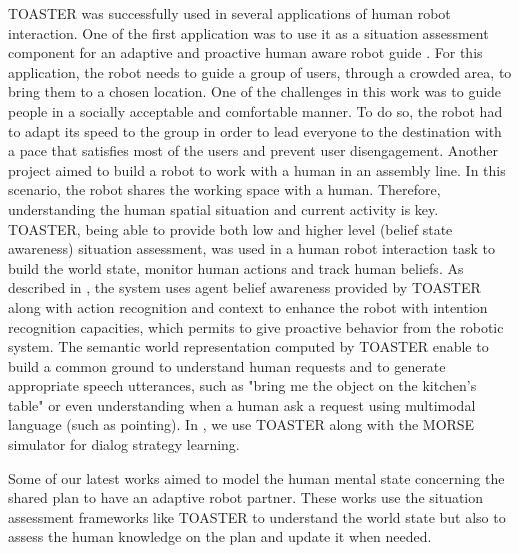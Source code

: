 \documentclass[a4paper]{article}
\begin{document}
TOASTER was successfully used in several applications of human robot interaction. One of the first application was to use it as a situation assessment component for an adaptive and proactive human aware robot guide \cite {fioreicsr2015}.
For this application, the robot needs to guide a group of users, through a crowded area, to bring them to a chosen location.
One of the challenges in this work was to guide people in a socially acceptable and comfortable manner. To do so, the robot had to adapt its speed to the group in order to lead everyone to the destination with a pace that satisfies most of the users and prevent user disengagement.
Another project aimed to build a robot to work with a human in an assembly line. In this scenario, the robot shares the working space with a human. Therefore, understanding the human spatial situation and current activity is key.
TOASTER, being able to provide  both low and higher level (belief state awareness) situation assessment, was used in a human robot interaction task to build the world state, monitor human actions and track human beliefs. As described in \cite{fiore2016}, the system uses agent belief awareness provided by TOASTER along with action recognition and context to enhance the robot with intention recognition capacities, which permits to give proactive behavior from the robotic system.
The semantic world representation computed by TOASTER enable to build a common ground to understand human requests and to generate appropriate speech utterances, such as "bring me the object on the kitchen's table" or even understanding when a human ask a request using multimodal language (such as pointing). In \cite{simpar_2014}, we use TOASTER along with the MORSE simulator for dialog strategy learning.

Some of our latest works aimed to model the human mental state concerning the shared plan to have an adaptive robot partner.
These works use the situation assessment frameworks like TOASTER to understand the world state but also to assess the human knowledge on the plan and update it when needed.


\end{document}
